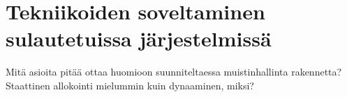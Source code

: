\chapter{Tekniikoiden soveltaminen sulautetuissa järjestelmissä} \label{Kuudes luku}

Mitä asioita pitää ottaa huomioon suunniteltaessa muistinhallinta rakennetta?
Staattinen allokointi mielummin kuin dynaaminen, miksi?